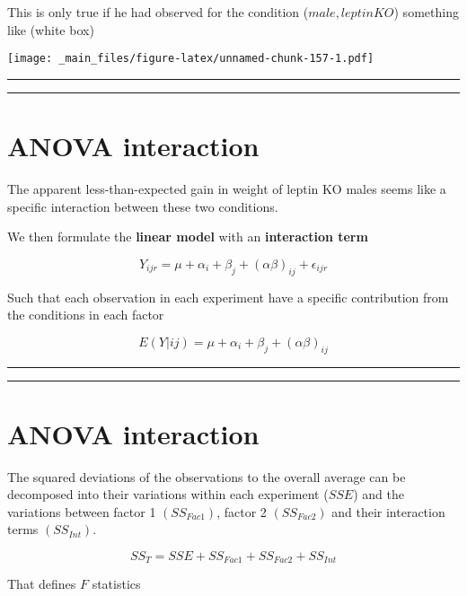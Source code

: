 \documentclass[
]{book}
\begin{document}
This is only true if he had observed for the condition (\(male, leptinKO\)) something like (white box)

\texttt{[image: \_main\_files/figure-latex/unnamed-chunk-157-1.pdf]}

\begin{center}\rule{0.5\linewidth}{0.5pt}\end{center}

\begin{center}\rule{0.5\linewidth}{0.5pt}\end{center}

\hypertarget{anova-interaction-2}{%
\section{ANOVA interaction}\label{anova-interaction-2}}

The apparent less-than-expected gain in weight of leptin KO males seems like a specific interaction between these two conditions.

We then formulate the \textbf{linear model} with an \textbf{interaction term}

\[Y_{ijr} = \mu + \alpha_i + \beta_j + (\alpha\beta)_{ij} + \epsilon_{ijr}\]

Such that each observation in each experiment have a specific contribution from the conditions in each factor

\[E(Y|ij)=\mu + \alpha_i+ \beta_j + (\alpha\beta)_{ij}\]

\begin{center}\rule{0.5\linewidth}{0.5pt}\end{center}

\begin{center}\rule{0.5\linewidth}{0.5pt}\end{center}

\hypertarget{anova-interaction-3}{%
\section{ANOVA interaction}\label{anova-interaction-3}}

The squared deviations of the observations to the overall average can be decomposed into their variations within each experiment (\(SSE\)) and the variations between factor 1 \((SS_{Fac1})\), factor 2 \((SS_{Fac2})\) and their interaction terms \((SS_{Int})\).

\[SS_T= SSE + SS_{Fac1} + SS_{Fac2}+ SS_{Int}\]

That defines \(F\) statistics
\end{document}
